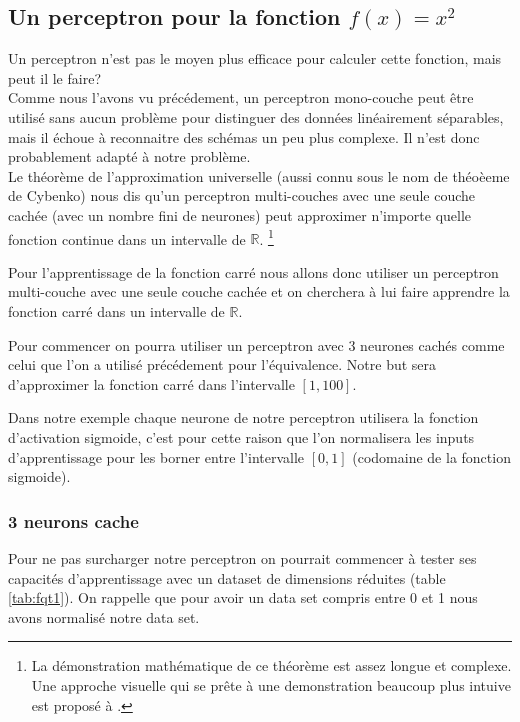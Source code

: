 \documentclass[twoside,openright,a4paper,11pt,french]{article}
\begin{document}
\subsection{Un perceptron pour la fonction $f(x) = x^2$}
Un perceptron n'est pas le moyen plus efficace pour calculer cette 
fonction, mais peut il le faire?\\

Comme nous l'avons vu précédement, un perceptron mono-couche peut être utilisé sans aucun
problème pour distinguer des données linéairement séparables, mais il échoue 
à reconnaitre des schémas un peu plus complexe. Il n'est donc 
probablement adapté à notre problème.\\

Le théorème de l'approximation universelle (aussi connu sous le nom de théoèeme de Cybenko) 
nous dis qu'un perceptron multi-couches avec une seule couche cachée (avec un nombre
fini de neurones) peut approximer n'importe quelle fonction continue dans un 
intervalle de $\mathbb{R}$.
\footnote{
La démonstration mathématique de ce théorème est assez longue et complexe. Une approche visuelle
qui se prête à une demonstration beaucoup plus intuive est proposé à \cite{visuniprof}.
}
\cite{cybthm}

Pour l'apprentissage de la fonction carré nous allons donc utiliser un perceptron
multi-couche avec une seule couche cachée et on cherchera à lui faire apprendre
la fonction carré dans un intervalle de $\mathbb{R}$.

Pour commencer on pourra utiliser un perceptron avec 3 neurones cachés comme
celui que l'on a utilisé précédement pour l'équivalence. Notre but sera
d'approximer la fonction carré dans l'intervalle $[1,100]$.

Dans notre exemple chaque neurone de notre perceptron utilisera la fonction
d'activation sigmoide, c'est pour cette raison que l'on normalisera les inputs
d'apprentissage pour les borner entre l'intervalle $[0,1]$ (codomaine de la
fonction sigmoide).

\subsubsection{3 neurons cache}

Pour ne pas surcharger notre  perceptron on pourrait commencer à tester
ses capacités d'apprentissage avec un dataset de dimensions réduites (table
\ref{tab:fqt1}). On rappelle que pour avoir un data set compris entre 0 et 1
nous avons normalisé notre data set.
\end{document}
